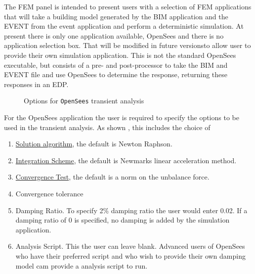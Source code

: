 The FEM panel is intended to present users with a selection of FEM
applications that will take a building model generated by the BIM
application and the EVENT from the event application and perform a
deterministic simulation.  At present there is only one application
available, OpenSees and there is no application selection box.  That
will be modified in future versionsto allow user to provide their own
simulation application.  This is not the standard OpenSees executable,
but consists of a pre- and post-processor to take the BIM and EVENT
file and use OpenSees to determine the response, returning these
responses in an EDP.

\begin{figure}[!htbp]
  \caption{Options for \texttt{OpenSees} transient analysis}
  \label{fig:fem}
\end{figure}

For the OpenSees application the user is required to specify the
options to be used in the transient analysis. As shown ,
this includes the choice of
\begin{enumerate}
\item \href{http://opensees.berkeley.edu/wiki/index.php/Algorithm_Command}{Solution algorithm}, the default is Newton Raphson.
\item \href{http://opensees.berkeley.edu/wiki/index.php/Integrator_Command}{Integration Scheme}, the default is Newmarks linear acceleration
  method.
\item \href{http://opensees.berkeley.edu/wiki/index.php/Test_Command}{Convergence Test}, the default is a norm on the unbalance force.
\item Convergence tolerance
\item Damping Ratio. To specify 2\% damping ratio the user would enter 0.02. If
a damping ratio of 0 is specified, no damping is added by the simulation application.
\item Analysis Script. This the user can leave blank. Advanced users of OpenSees who have their preferred script
and who wish to provide their own damping model cam provide a analysis script to run.
\end{enumerate}


